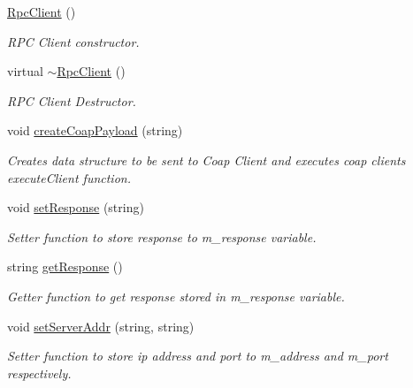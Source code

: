 \begin{DoxyCompactItemize}
\item 
\mbox{\label{classcoappbrpc_1_1RpcClient_a7b8bc754005e340d675684edae545084}} 
\hyperlink{classcoappbrpc_1_1RpcClient_a7b8bc754005e340d675684edae545084}{Rpc\+Client} ()
\begin{DoxyCompactList}\small\item\em R\+PC Client constructor. \end{DoxyCompactList}\item 
\mbox{\label{classcoappbrpc_1_1RpcClient_a9b90b3ba0fef5ebd90748e454c1c7fd9}} 
virtual \hyperlink{classcoappbrpc_1_1RpcClient_a9b90b3ba0fef5ebd90748e454c1c7fd9}{$\sim$\+Rpc\+Client} ()
\begin{DoxyCompactList}\small\item\em R\+PC Client Destructor. \end{DoxyCompactList}\item 
\mbox{\label{classcoappbrpc_1_1RpcClient_a17515cafc3ef2d46517ff18b165fb452}} 
void \hyperlink{classcoappbrpc_1_1RpcClient_a17515cafc3ef2d46517ff18b165fb452}{create\+Coap\+Payload} (string)
\begin{DoxyCompactList}\small\item\em Creates data structure to be sent to Coap Client and executes coap client\textquotesingle{}s execute\+Client function. \end{DoxyCompactList}\item 
void \hyperlink{classcoappbrpc_1_1RpcClient_a0f08b63838a62377d4470eb2a0259178}{set\+Response} (string)
\begin{DoxyCompactList}\small\item\em Setter function to store response to m\+\_\+response variable. \end{DoxyCompactList}\item 
\mbox{\label{classcoappbrpc_1_1RpcClient_ac79e3b2a76335a214cbe1c6f169d46c2}} 
string \hyperlink{classcoappbrpc_1_1RpcClient_ac79e3b2a76335a214cbe1c6f169d46c2}{get\+Response} ()
\begin{DoxyCompactList}\small\item\em Getter function to get response stored in m\+\_\+response variable. \end{DoxyCompactList}\item 
void \hyperlink{classcoappbrpc_1_1RpcClient_a69755d690a7f2d6373e191d359e48986}{set\+Server\+Addr} (string, string)
\begin{DoxyCompactList}\small\item\em Setter function to store ip address and port to m\+\_\+address and m\+\_\+port respectively. \end{DoxyCompactList}\end{DoxyCompactItemize}
